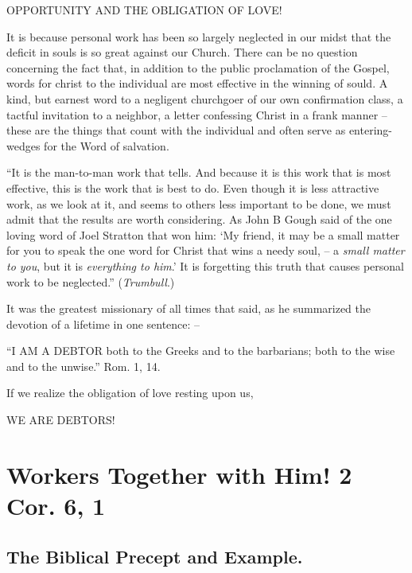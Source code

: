 \documentclass[
]{book}
\begin{document}
\begin{center} OPPORTUNITY AND THE OBLIGATION OF LOVE! \end{center}

It is because personal work has been so largely neglected in our midst that the deficit in souls is so great against our Church. There can be no question concerning the fact that, in addition to the public proclamation of the Gospel, words for christ to the individual are most effective in the winning of sould. A kind, but earnest word to a negligent churchgoer of our own confirmation class, a tactful invitation to a neighbor, a letter confessing Christ in a frank manner -- these are the things that count with the individual and often serve as entering-wedges for the Word of salvation.

``It is the man-to-man work that tells. And because it is this work that is most effective, this is the work that is best to do. Even though it is less attractive work, as we look at it, and seems to others less important to be done, we must admit that the results are worth considering. As John B Gough said of the one loving word of Joel Stratton that won him: `My friend, it may be a small matter for you to speak the one word for Christ that wins a needy soul, -- a \emph{small matter to you}, but it is \emph{everything to him}.' It is forgetting this truth that causes personal work to be neglected.'' (\emph{Trumbull}.)

It was the greatest missionary of all times that said, as he summarized the devotion of a lifetime in one sentence: --

``I AM A DEBTOR both to the Greeks and to the barbarians; both to the wise and to the unwise.'' Rom. 1, 14.

If we realize the obligation of love resting upon us,

\begin{center} WE ARE DEBTORS! \end{center}

\hypertarget{workers-together-with-him-2-cor.-6-1}{%
\chapter{Workers Together with Him! 2 Cor. 6, 1}\label{workers-together-with-him-2-cor.-6-1}}

\hypertarget{the-biblical-precept-and-example.}{%
\section*{The Biblical Precept and Example.}\label{the-biblical-precept-and-example.}}
\end{document}
